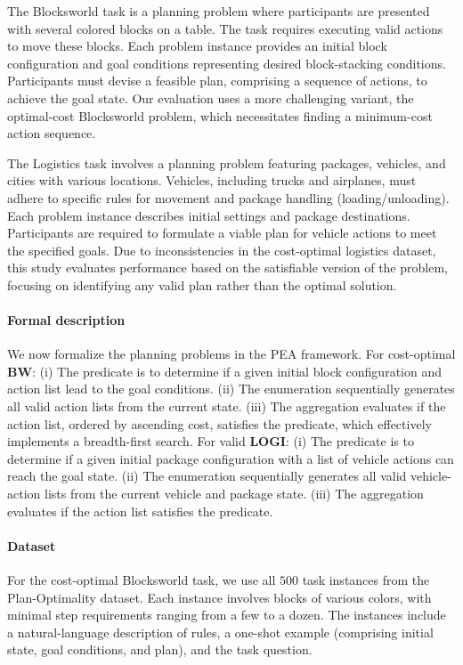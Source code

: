 The Blocksworld task is a planning problem where participants are presented with several colored blocks on a table. The task requires executing valid actions to move these blocks. Each problem instance provides an initial block configuration and goal conditions representing desired block-stacking conditions. Participants must devise a feasible plan, comprising a sequence of actions, to achieve the goal state. Our evaluation uses a more challenging variant, the optimal-cost Blocksworld problem, which necessitates finding a minimum-cost action sequence.

The Logistics task involves a planning problem featuring packages, vehicles, and cities with various locations. Vehicles, including trucks and airplanes, must adhere to specific rules for movement and package handling (loading/unloading). Each problem instance describes initial settings and package destinations. Participants are required to formulate a viable plan for vehicle actions to meet the specified goals. Due to inconsistencies in the cost-optimal logistics dataset, this study evaluates performance based on the satisfiable version of the problem, focusing on identifying any valid plan rather than the optimal solution.


\paragraph{Formal description} We now formalize the planning problems in the PEA framework.
For cost-optimal \textbf{BW}: (i) The predicate is to determine if a given initial block configuration and action list lead to the goal conditions. (ii) The enumeration sequentially generates all valid action lists from the current state. (iii) The aggregation evaluates if the action list, ordered by ascending cost, satisfies the predicate, which effectively implements a breadth-first search.
For valid \textbf{LOGI}: (i) The predicate is to determine if a given initial package configuration with a list of vehicle actions can reach the goal state. (ii) The enumeration sequentially generates all valid vehicle-action lists from the current vehicle and package state. (iii) The aggregation evaluates if the action list satisfies the predicate.


\paragraph{Dataset} For the cost-optimal Blocksworld task, we use all $500$ task instances from the Plan-Optimality dataset. Each instance involves blocks of various colors, with minimal step requirements ranging from a few to a dozen. The instances include a natural-language description of rules, a one-shot example (comprising initial state, goal conditions, and plan), and the task question.

